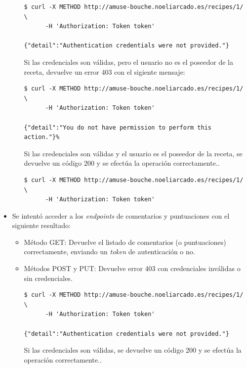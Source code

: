 \begin{itemize}
\begin{itemize}
    \begin{verbatim}
$ curl -X METHOD http://amuse-bouche.noeliarcado.es/recipes/1/ \
      -H 'Authorization: Token token'

{"detail":"Authentication credentials were not provided."}            
    \end{verbatim}

    Si las credenciales son válidas, pero el usuario no es el poseedor de la
    receta, devuelve un error 403 con el sigiente mensaje:

    \begin{verbatim}
$ curl -X METHOD http://amuse-bouche.noeliarcado.es/recipes/1/ \
      -H 'Authorization: Token token'

{"detail":"You do not have permission to perform this action."}%               
    \end{verbatim}

    Si las credenciales son válidas y el usuario es el poseedor de la receta,
    se devuelve un código 200 y se efectúa la operación correctamente..

    \begin{verbatim}
$ curl -X METHOD http://amuse-bouche.noeliarcado.es/recipes/1/ \
      -H 'Authorization: Token token'    
    \end{verbatim}
    
  \end{itemize}

\item Se intentó acceder a los \textit{endpoints} de comentarios y puntuaciones
  con el siguiente resultado:

  \begin{itemize}
  \item Método GET: Devuelve el listado de comentarios (o puntuaciones)
    correctamente, enviando un \textit{token} de autenticación o no.

  \item Métodos POST y PUT: Devuelve error 403 con credenciales
    inválidas o sin credenciales.

    \begin{verbatim}
$ curl -X METHOD http://amuse-bouche.noeliarcado.es/recipes/1/ \
      -H 'Authorization: Token token'

{"detail":"Authentication credentials were not provided."}            
    \end{verbatim}

    Si las credenciales son válidas, se devuelve un código 200 y se efectúa la
    operación correctamente..


\end{itemize}
\end{itemize}
